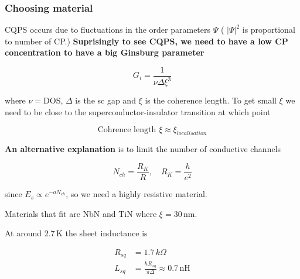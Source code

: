   \subsubsection{Choosing material}
  \label{sec:choosing-material}

  CQPS  occurs   due  to   fluctuations  in  the   order  parameters   $\Psi$  (
  $\left|\Psi\right|^2$ is  proportional to number of  CP.)  \textbf{Suprisingly
    to see CQPS, we  need to have a low CP concentration to  have a big Ginsburg
    parameter}

  \begin{equation}
    G_{i} = \frac{1}{\nu \Delta \xi^3}
  \end{equation}

  \noindent where $\nu=$DOS,  $\Delta$ is the sc gap and  $\xi$ is the coherence
  length.    To   get    small   $\xi$   we   need   to   be    close   to   the
  superconductor-insulator transition at which point

  \begin{equation}
    \text{Cohrence length } \xi \approx \xi_{localisation}
  \end{equation}

  \noindent  \textbf{An  alternative explanation}  is  to  limit the  number  of
  conductive channels

  \begin{equation}
    N_{ch} = \frac{R_{K}}{R}, \quad R_K=\frac{h}{e^{2}}
  \end{equation}

  \noindent  since $E_s  \propto e^{-aN_{ch}}$,  so we  need a  highly resistive
  material.

  \begin{framed}\noindent
    Materials that fit are NbN and TiN where $\xi = 30\,\text{nm}$.

    At around 2.7\,K the sheet inductance is

    \begin{equation}
      \begin{aligned}
        R_{sq} & = 1.7\,k\Omega \\
        L_{sq} & = \frac{\hbar R_{sq}}{\pi\Delta} \approx 0.7\,\text{nH}
      \end{aligned}
    \end{equation}

    \noindent
  \end{framed}

